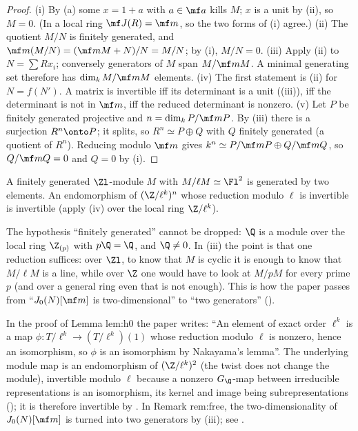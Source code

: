 \begin{proof}
(i) By (a) some $x=1+a$ with $a\in\mf a$ kills $M$; $x$ is a unit by
(ii), so $M=0$. (In a local ring $\mf J(R)=\mf m$, so the two forms of (i) agree.) (ii) The quotient
$M/N$ is finitely generated, and $\mf m(M/N)=(\mf mM+N)/N=M/N$; by (i), $M/N=0$. (iii) Apply (ii) to
$N=\sum Rx_i$; conversely generators of $M$ span $M/\mf mM$. A minimal generating set therefore has $\dim_kM/\mf mM$ elements.
(iv) The first statement is (ii) for $N=f(N')$. A matrix is invertible iff its determinant is a unit
((iii)), iff the determinant is not in $\mf m$, iff the reduced determinant is nonzero.
(v) Let $P$ be finitely generated projective and $n=\dim_kP/\mf mP$. By (iii) there is a surjection $R^n\onto P$; it splits, so
$R^n\simeq P\oplus Q$ with $Q$ finitely generated (a quotient of $R^n$). Reducing modulo $\mf m$ gives $k^n\simeq P/\mf mP\oplus Q/\mf mQ$,
so $Q/\mf mQ=0$ and $Q=0$ by (i).
\end{proof}

\begin{example}\label{ex:modules:nakayama}
A finitely generated $\Zl$-module $M$ with $M/\ell M\simeq\Fl^2$ is generated by two elements. An endomorphism of $(\Z/\ell^k)^n$ whose
reduction modulo $\ell$ is invertible is invertible (apply (iv) over the local ring $\Z/\ell^k$).
\end{example}

The hypothesis ``finitely generated'' cannot be dropped: $\Q$ is a module over the local ring $\Z_{(p)}$ with $p\Q=\Q$, and $\Q\ne0$. In
(iii) the point is that one reduction suffices: over $\Zl$, to know that $M$ is cyclic it is enough to know that $M/\ell M$ is a line,
while over $\Z$ one would have to look at $M/pM$ for every prime $p$ (and over a general ring even that is not enough). This is how
the paper passes from ``$J_0(N)[\mf m]$ is two-dimensional'' to ``two generators'' ().

\begin{paperlink}\label{pl:modules:nakayama}
In the proof of Lemma lem:h0 the paper writes: ``An element of exact order $\ell^k$ is a map $\phi\colon T/\ell^k\to(T/\ell^k)(1)$ whose
reduction modulo $\ell$ is nonzero, hence an isomorphism, so $\phi$ is an isomorphism by Nakayama's lemma''. The underlying
module map is an endomorphism of $(\Z/\ell^k)^2$ (the twist does not change the module), invertible modulo $\ell$ because a nonzero
$G_\Q$-map between irreducible representations is an isomorphism, its kernel and image being subrepresentations (); it
is therefore invertible by . In Remark rem:free, the two-dimensionality of $J_0(N)[\mf m]$ is turned into
two generators by (iii); see .
\end{paperlink}


